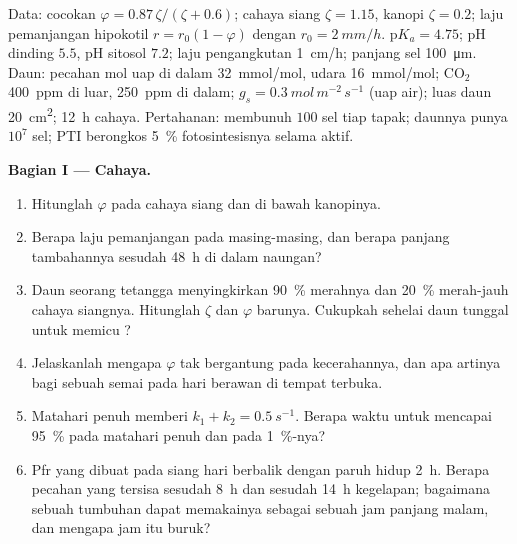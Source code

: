 \begin{problem}
\label{pb:b3:plant-molecular-physiology:1}
Data: cocokan  $\varphi = 0.87\,\zeta/(\zeta + 0.6)$;
cahaya siang $\zeta = 1.15$, kanopi $\zeta = 0.2$; laju pemanjangan
hipokotil $r = r_{0}(1 - \varphi)$ dengan $r_{0} = \qty{2}{mm/h}$. 
$\mathrm{p}K_{a} = 4.75$; pH dinding $5.5$, pH sitosol $7.2$; laju
pengangkutan \qty{1}{cm/h}; panjang sel \qty{100}{\micro m}. Daun: pecahan mol
uap di dalam \qty{32}{mmol/mol}, udara \qty{16}{mmol/mol};
CO$_{2}$ \qty{400}{ppm} di luar, \qty{250}{ppm} di dalam; $g_{s} =
\qty{0.3}{mol\,m^{-2}\,s^{-1}}$ (uap air); luas daun
\qty{20}{cm^2}; \qty{12}{h} cahaya. Pertahanan: 
membunuh $100$ sel tiap tapak; daunnya punya $10^{7}$ sel; PTI berongkos
\qty{5}{\%} fotosintesisnya selama aktif.

\medskip
\noindent\textbf{Bagian I --- Cahaya.}
\begin{enumerate}
  \item Hitunglah $\varphi$ pada cahaya siang dan di bawah kanopinya.
  \item Berapa laju pemanjangan pada masing-masing, dan berapa panjang tambahannya sesudah
        \qty{48}{h} di dalam naungan?
  \item Daun seorang tetangga menyingkirkan \qty{90}{\%} merahnya dan
        \qty{20}{\%} merah-jauh cahaya siangnya. Hitunglah $\zeta$ dan $\varphi$
        barunya. Cukupkah sehelai daun tunggal untuk memicu ?
  \item Jelaskanlah mengapa $\varphi$ tak bergantung pada kecerahannya, dan apa
        artinya bagi sebuah semai pada hari berawan di tempat terbuka.
  \item Matahari penuh memberi $k_{1} + k_{2} = \qty{0.5}{s^{-1}}$. Berapa waktu untuk mencapai
        \qty{95}{\%}  pada matahari penuh dan pada
        \qty{1}{\%}-nya?
  \item Pfr yang dibuat pada siang hari berbalik dengan paruh hidup \qty{2}{h}.
        Berapa pecahan yang tersisa sesudah \qty{8}{h} dan sesudah \qty{14}{h} kegelapan;
        bagaimana sebuah tumbuhan dapat memakainya sebagai sebuah jam panjang malam, dan mengapa
        jam itu buruk?
\end{enumerate}


\end{problem}
